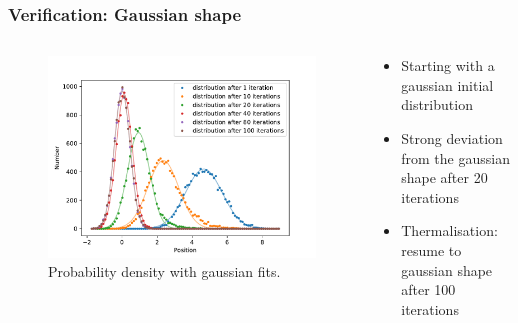 \documentclass[aspectratio=169]{beamer}
\begin{document}
\begin{frame}
	\frametitle{Verification: Gaussian shape}
	\vspace{-15px}
	\begin{columns}
		\begin{column}{0.6\textwidth}
			\begin{figure}[H]
				\centering
					\includegraphics[width=\textwidth]{../imgs/harmonic_oscillator_track/track_10010000_gauss_1_fit.pdf}
				\caption{Probability density with gaussian fits.}
				\label{fig:harmonic_oscillator_track_10010000_gauss_1_fit}
			\end{figure}
		\end{column}
		\begin{column}{0.39\textwidth}
			\begin{itemize}
				\item Starting with a gaussian initial distribution
				\item Strong deviation from the gaussian shape after 20 iterations
				\item Thermalisation: resume to gaussian shape after 100 iterations
			\end{itemize}
		\end{column}
	\end{columns}
\end{frame}
\end{document}
